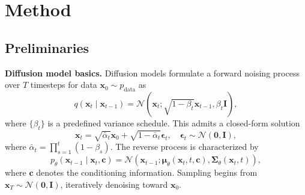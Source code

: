 \section{Method}\label{sec:method}

\subsection{Preliminaries}\label{sub:method:preliminaries}

\textbf{Diffusion model basics.}
Diffusion models formulate a forward noising process
over $T$ timesteps for data $\mathbf{x}_0 \sim p_{\text{data}}$
as
\begin{equation}
    q(\mathbf{x}_t \mid \mathbf{x}_{t-1}) = \mathcal{N}\!
    \left(\mathbf{x}_t; \sqrt{1-\beta_t}\mathbf{x}_{t-1}, \beta_t \mathbf{I}\right),
    \label{eq:method:prelim:forward}
\end{equation}
where $\{\beta_t\}$ is a predefined variance schedule.
This admits a closed-form solution
\begin{equation}
    \mathbf{x}_t =
    \sqrt{\bar{\alpha}_t}\mathbf{x}_0 +
    \sqrt{1-\bar{\alpha}_t}\boldsymbol{\epsilon}_t, \quad
    \boldsymbol{\epsilon}_t \sim \mathcal{N}(\mathbf{0}, \mathbf{I}),
    \label{eq:method:prelim:forward-closed}
\end{equation}
where $\bar{\alpha}_t = \prod_{s=1}^t (1-\beta_s)$.
The reverse process is characterized by
\begin{equation}
    p_\theta(\mathbf{x}_{t-1} \mid \mathbf{x}_t, \mathbf{c}) = \mathcal{N}\!
    \left(\mathbf{x}_{t-1};
    \boldsymbol{\mu}_\theta(\mathbf{x}_t, t, \mathbf{c}),
    \boldsymbol{\Sigma}_\theta(\mathbf{x}_t, t)\right),
    \label{eq:method:prelim:reverse}
\end{equation}
where $\mathbf{c}$ denotes the conditioning information.
Sampling begins from $\mathbf{x}_T \sim \mathcal{N}(\mathbf{0}, \mathbf{I})$,
iteratively denoising toward $\mathbf{x}_0$.

